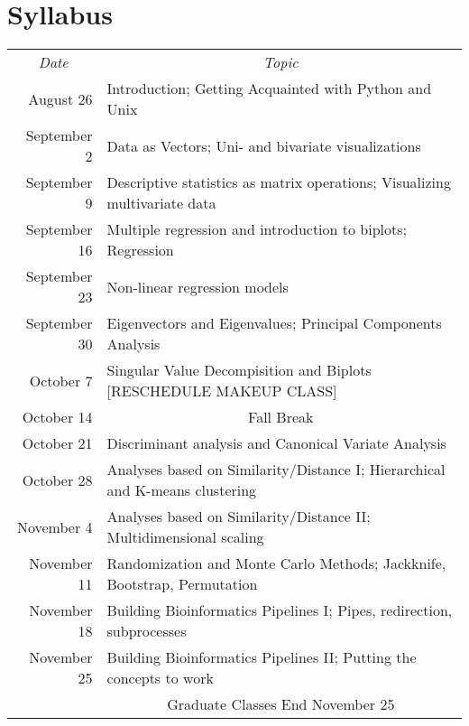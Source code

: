 \documentclass[11pt,letterpaper]{article}
\begin{document}
\section*{Syllabus}

\renewcommand{\arraystretch}{1.4}
\begin{center}
\begin{tabular}{rp{5.5in}}
\multicolumn{1}{c}{{\sl Date}} & \multicolumn{1}{c}{{\sl Topic}} \\

August 26 & Introduction; Getting Acquainted with Python and Unix \\
September 2 & Data as Vectors; Uni- and bivariate visualizations\\
September 9 & Descriptive statistics as matrix operations; Visualizing multivariate data\\
September 16 & Multiple regression and introduction to biplots; Regression\\
September 23 & Non-linear regression models\\
September 30 & Eigenvectors and Eigenvalues; Principal Components Analysis \\
October 7 & Singular Value Decompisition and Biplots [RESCHEDULE MAKEUP CLASS]\\
October 14 & \multicolumn{1}{c}{{\sc Fall Break}} \\
October 21 & Discriminant analysis and Canonical Variate Analysis\\
October 28 & Analyses based on Similarity/Distance I; Hierarchical and K-means clustering\\
November 4 & Analyses based on Similarity/Distance II; Multidimensional scaling\\
November 11 & Randomization and Monte Carlo Methods; Jackknife, Bootstrap, Permutation\\
November 18 & Building Bioinformatics Pipelines I; Pipes, redirection, subprocesses \\
November 25 & Building Bioinformatics Pipelines II; Putting the concepts to work \\

& \multicolumn{1}{c}{{\sc Graduate Classes End November 25}} \\
\end{tabular}
\end{center}
\end{document}
